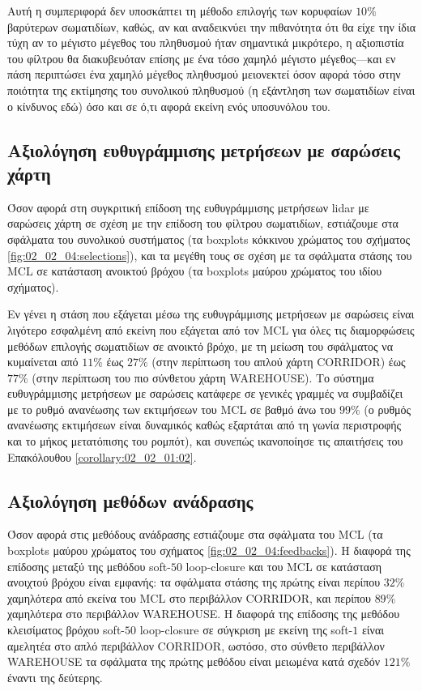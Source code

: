 Αυτή η συμπεριφορά δεν υποσκάπτει τη μέθοδο επιλογής των κορυφαίων $10\%$
βαρύτερων σωματιδίων, καθώς, αν και αναδεικνύει την πιθανότητα ότι θα είχε την
ίδια τύχη αν το μέγιστο μέγεθος του πληθυσμού ήταν σημαντικά μικρότερο, η
αξιοπιστία του φίλτρου θα διακυβευόταν επίσης με ένα τόσο χαμηλό μέγιστο
μέγεθος---και εν πάση περιπτώσει ένα χαμηλό μέγεθος πληθυσμού μειονεκτεί όσον
αφορά τόσο στην ποιότητα της εκτίμησης του συνολικού πληθυσμού (η εξάντληση των
σωματιδίων είναι ο κίνδυνος εδώ) όσο και σε ό,τι αφορά εκείνη ενός υποσυνόλου
του.


\subsection{Αξιολόγηση ευθυγράμμισης μετρήσεων με σαρώσεις χάρτη}
\label{subsection:02_02_04:04}

Όσον αφορά στη συγκριτική επίδοση της ευθυγράμμισης μετρήσεων lidar με σαρώσεις
χάρτη σε σχέση με την επίδοση του φίλτρου σωματιδίων, εστιάζουμε στα σφάλματα
του συνολικού συστήματος (τα boxplots κόκκινου χρώματος του σχήματος
\ref{fig:02_02_04:selections}), και τα μεγέθη τους σε σχέση με τα σφάλματα
στάσης του MCL σε κατάσταση ανοικτού βρόχου (τα boxplots μαύρου χρώματος του
ιδίου σχήματος).

Εν γένει η στάση που εξάγεται μέσω της ευθυγράμμισης μετρήσεων με σαρώσεις
είναι λιγότερο εσφαλμένη από εκείνη που εξάγεται από τον MCL για όλες τις
διαμορφώσεις μεθόδων επιλογής σωματιδίων σε ανοικτό βρόχο, με τη μείωση του
σφάλματος να κυμαίνεται από $11\%$ έως $27\%$ (στην περίπτωση του απλού χάρτη
CORRIDOR) έως $77\%$ (στην περίπτωση του πιο σύνθετου χάρτη
WAREHOUSE). Το σύστημα ευθυγράμμισης μετρήσεων με σαρώσεις κατάφερε σε γενικές
γραμμές να συμβαδίζει με το ρυθμό ανανέωσης των εκτιμήσεων του MCL σε
βαθμό άνω του $99\%$ (ο ρυθμός ανανέωσης εκτιμήσεων είναι δυναμικός καθώς
εξαρτάται από τη γωνία περιστροφής και το μήκος μετατόπισης του ρομπότ), και
συνεπώς ικανοποίησε τις απαιτήσεις του Επακόλουθου \ref{corollary:02_02_01:02}.

\subsection{Αξιολόγηση μεθόδων ανάδρασης}
\label{subsection:02_02_04:05}

Όσον αφορά στις μεθόδους ανάδρασης εστιάζουμε στα σφάλματα του MCL (τα
boxplots μαύρου χρώματος του σχήματος \ref{fig:02_02_04:feedbacks}). Η διαφορά
της επίδοσης μεταξύ της μεθόδου soft-$50$ loop-closure και του MCL σε κατάσταση
ανοιχτού βρόχου είναι εμφανής: τα σφάλματα στάσης της πρώτης είναι περίπου
$32\%$ χαμηλότερα από εκείνα του MCL στο περιβάλλον CORRIDOR, και περίπου
$89\%$ χαμηλότερα στο περιβάλλον WAREHOUSE. Η διαφορά της επίδοσης της μεθόδου
κλεισίματος βρόχου soft-$50$ loop-closure σε σύγκριση με εκείνη της soft-$1$
είναι αμελητέα στο απλό περιβάλλον CORRIDOR, ωστόσο, στο σύνθετο περιβάλλον
WAREHOUSE τα σφάλματα της πρώτης μεθόδου είναι μειωμένα κατά σχεδόν $121\%$
έναντι της δεύτερης.

